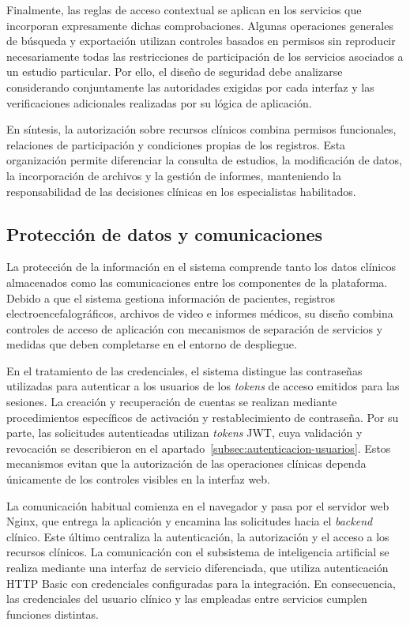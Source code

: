 Finalmente, las reglas de acceso contextual se aplican en los servicios que incorporan expresamente dichas comprobaciones. Algunas operaciones generales de búsqueda y exportación utilizan controles basados en permisos sin reproducir necesariamente todas las restricciones de participación de los servicios asociados a un estudio particular. Por ello, el diseño de seguridad debe analizarse considerando conjuntamente las autoridades exigidas por cada interfaz y las verificaciones adicionales realizadas por su lógica de aplicación.

En síntesis, la autorización sobre recursos clínicos combina permisos funcionales, relaciones de participación y condiciones propias de los registros. Esta organización permite diferenciar la consulta de estudios, la modificación de datos, la incorporación de archivos y la gestión de informes, manteniendo la responsabilidad de las decisiones clínicas en los especialistas habilitados.


\subsection{Protección de datos y comunicaciones}
\label{subsec:proteccion-datos-comunicaciones}

La protección de la información en el sistema comprende tanto los datos clínicos almacenados como las comunicaciones entre los componentes de la plataforma. Debido a que el sistema gestiona información de pacientes, registros electroencefalográficos, archivos de video e informes médicos, su diseño combina controles de acceso de aplicación con mecanismos de separación de servicios y medidas que deben completarse en el entorno de despliegue.

En el tratamiento de las credenciales, el sistema distingue las contraseñas utilizadas para autenticar a los usuarios de los \textit{tokens} de acceso emitidos para las sesiones. La creación y recuperación de cuentas se realizan mediante procedimientos específicos de activación y restablecimiento de contraseña. Por su parte, las solicitudes autenticadas utilizan \textit{tokens} JWT, cuya validación y revocación se describieron en el apartado~\ref{subsec:autenticacion-usuarios}. Estos mecanismos evitan que la autorización de las operaciones clínicas dependa únicamente de los controles visibles en la interfaz web.

La comunicación habitual comienza en el navegador y pasa por el servidor web Nginx, que entrega la aplicación y encamina las solicitudes hacia el \textit{backend} clínico. Este último centraliza la autenticación, la autorización y el acceso a los recursos clínicos. La comunicación con el subsistema de inteligencia artificial se realiza mediante una interfaz de servicio diferenciada, que utiliza autenticación HTTP Basic con credenciales configuradas para la integración. En consecuencia, las credenciales del usuario clínico y las empleadas entre servicios cumplen funciones distintas.

